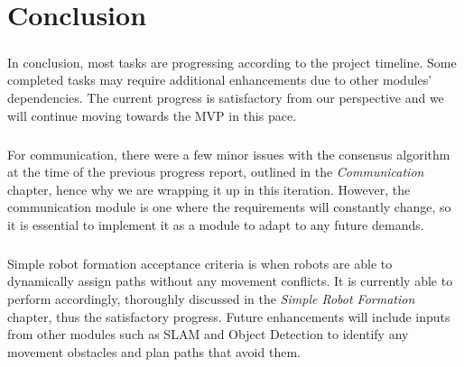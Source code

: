 \chapter{Conclusion}

\paragraph*{}
In conclusion, most tasks are progressing according to the project timeline. Some completed tasks may require additional enhancements due to other modules' dependencies. The current progress is satisfactory from our perspective and we will continue moving towards the MVP in this pace.

\paragraph*{}
For communication, there were a few minor issues with the consensus algorithm at the time of the previous progress report, outlined in the \textit{Communication} chapter, hence why we are wrapping it up in this iteration. However, the communication module is one where the requirements will constantly change, so it is essential to implement it as a module to adapt to any future demands.

\paragraph*{}
Simple robot formation acceptance criteria is when robots are able to dynamically assign paths without any movement conflicts. It is currently able to perform accordingly, thoroughly discussed in the \textit{Simple Robot Formation} chapter, thus the satisfactory progress. Future enhancements will include inputs from other modules such as SLAM and Object Detection to identify any movement obstacles and plan paths that avoid them.

